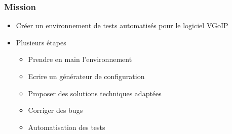 \begin{frame}
    \frametitle{Mission}
    \begin{itemize}
        \item Créer un environnement de tests automatisés pour le logiciel VGoIP
        \item Plusieurs étapes
            \begin{itemize}
                \item Prendre en main l'environnement
                \item Ecrire un générateur de configuration
                \item Proposer des solutions techniques adaptées
                \item Corriger des bugs
                \item Automatisation des tests
            \end{itemize}
    \end{itemize}
\end{frame}